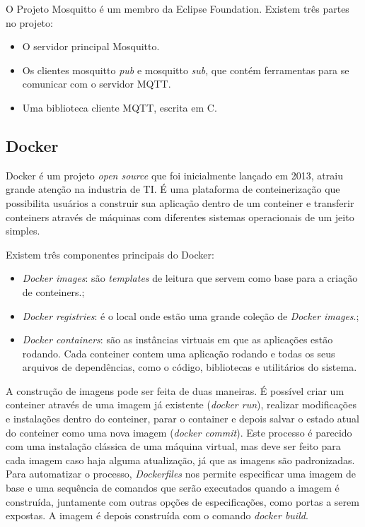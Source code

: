 O Projeto Mosquitto é um membro da Eclipse Foundation. Existem três partes no projeto:

\begin{itemize}
	\item O servidor principal Mosquitto.
	\item Os clientes mosquitto \textit{pub} e mosquitto \textit{sub}, que contém ferramentas para se comunicar com o servidor MQTT.
	\item Uma biblioteca cliente MQTT, escrita em C.
\end{itemize}

\subsection{Docker}

Docker é um projeto \textit{open source} que foi inicialmente lançado em 2013, atraiu grande atenção na industria de TI. É uma plataforma de conteinerização que possibilita usuários a construir sua aplicação dentro de um conteiner e transferir conteiners através de máquinas com diferentes sistemas operacionais de um jeito simples. \cite{chang2017kubernetes}

Existem três componentes principais do Docker:

\begin{itemize}
	\item \textit{Docker images}: são \textit{templates} de leitura que servem como base para a criação de conteiners.;
	\item \textit{Docker registries}: é o local onde estão uma grande coleção de \textit{Docker images}.;
	\item \textit{Docker containers}: são as instâncias virtuais em que as aplicações estão rodando. Cada conteiner contem uma aplicação rodando e todas os seus arquivos de dependências, como o código, bibliotecas e utilitários do sistema.
\end{itemize}

A construção de imagens pode ser feita de duas maneiras. É possível criar um conteiner através de uma imagem já existente (\textit{docker run}), realizar modificações e instalações dentro do conteiner, parar o container e depois salvar o estado atual do conteiner como uma nova imagem (\textit{docker commit}). Este processo é parecido com uma instalação clássica de uma máquina virtual, mas deve ser feito para cada imagem caso haja alguma atualização, já que as imagens são padronizadas. Para automatizar o processo, \textit{Dockerfiles} nos permite especificar uma imagem de base e uma sequência de comandos que serão executados quando a imagem é construída, juntamente com outras opções de especificações, como portas a serem expostas. A imagem é depois construída com o comando \textit{docker build}.\cite{DiPietro}
